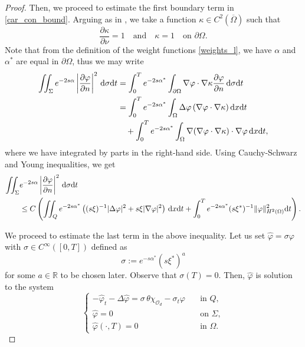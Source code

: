 \documentclass{aims}
\theoremstyle{definition}
\def\dx{\,\textnormal{d}x}
\def\dt{\textnormal{d}t}
\def\d{\,\textnormal{d}}
\begin{document}
\begin{proof}
Then, we proceed to estimate the first boundary term in \eqref{car_con_bound}. Arguing as in \cite{duprez_lissy}, we take a function $\kappa\in C^2(\overline \Omega)$ such that
%
\begin{equation*}
\frac{\partial \kappa}{\partial \nu}=1 \quad\text{and}\quad \kappa=1 \quad \text{on } \partial \Omega.
\end{equation*}
%
Note that from the definition of the weight functions \eqref{weights_l}, we have $\alpha$ and $\alpha^*$ are equal in $\partial \Omega$, thus we may write
%
\begin{equation*}
\begin{split}
\iint_{\Sigma}e^{-2s\alpha}\left|\frac{\partial \varphi}{\partial n}\right|^2\d\sigma\dt&=\int_{0}^{T}e^{-2s\alpha^*}\int_{\partial \Omega}\nabla\varphi\cdot \nabla \kappa\frac{\partial \varphi}{\partial n} \d\sigma \dt\\
&=\int_{0}^{T}e^{-2s\alpha^*}\int_{\Omega}\Delta \varphi\,(\nabla\varphi\cdot \nabla \kappa)\dx\dt\\
&\quad +\int_{0}^Te^{-2s\alpha^*}\int_\Omega\nabla (\nabla\varphi\cdot\nabla\kappa)\cdot\nabla \varphi \dx\dt,
\end{split}
\end{equation*}
%
where we have integrated by parts in the right-hand side. Using Cauchy-Schwarz and Young inequalities, we get
%
\begin{equation}\label{estimate_1}
\begin{split}
\iint_{\Sigma}&e^{-2s\alpha}\left|\frac{\partial \varphi}{\partial n}\right|^2\d\sigma \dt\\
&\leq C\left(\iint_Q e^{-2s\alpha^*}\left((s\xi)^{-1}|\Delta \varphi|^2 + s\xi|\nabla \varphi|^2\right)\dx\dt+\int_{0}^{T}e^{-2s\alpha^*}(s\xi^*)^{-1}\|\varphi\|^2_{H^2(\Omega)}\dt\right).
\end{split}
\end{equation}

We proceed to estimate the last term in the above inequality. Let us set $\widehat \varphi=\sigma\varphi$ with $\sigma\in C^\infty([0,T])$ defined as
%
\begin{equation}\label{rho_def}
\sigma:=e^{-s\alpha^*}(s\xi^*)^a
\end{equation}
%
for some $a\in \mathbb R$ to be chosen later. Observe that $\sigma(T)=0$. Then, $\widehat{\varphi}$ is solution to the system
%
\begin{equation}\label{phi_gorro}
\begin{cases}
-\widehat\varphi_t-\Delta \widehat\varphi=\sigma\,\theta\chi_{\mathcal O_d}-\sigma_t\varphi \quad& \text{in } Q, \\
\widehat\varphi=0 \quad& \text{on } \Sigma, \\
\widehat{\varphi}(\cdot,T)=0 \quad&\text{in } \Omega.
\end{cases}
\end{equation}


\end{proof}
\end{document}

